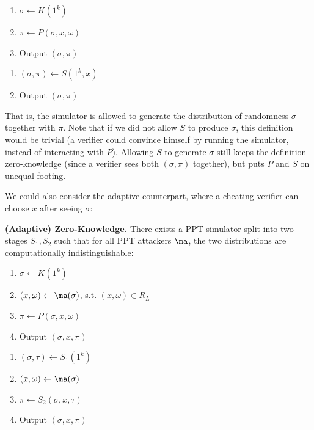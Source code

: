 \begin{minipage}{0.5\textwidth}
    \begin{enumerate}[itemsep=-3pt]
        \item $\sigma \gets K(1^k)$
        \item $\pi \gets P(\sigma, x, \omega)$
        \item Output $(\sigma, \pi)$
    \end{enumerate}
\end{minipage}
\begin{minipage}{0.5\textwidth}
    \begin{enumerate}
        \item $(\sigma, \pi) \gets S(1^k, x)$
        \item Output $(\sigma, \pi)$
    \end{enumerate}
\end{minipage}

\medskip
That is, the simulator is allowed to generate the distribution of randomness
$\sigma$ together with $\pi$. Note that if we did not allow $S$ to produce
$\sigma$, this definition would be trivial (a verifier could convince himself by
running the simulator, instead of interacting with $P$). Allowing $S$ to
generate $\sigma$ still keeps the definition zero-knowledge (since a verifier sees both $(\sigma,
\pi)$ together), but puts $P$ and $S$ on unequal footing.

We could also consider the adaptive counterpart, where a cheating verifier can
choose $x$ after seeing $\sigma$:

\medskip
\noindent\textbf{(Adaptive) Zero-Knowledge.}
    There exists a PPT simulator split into two stages $S_1, S_2$ such that
    for all PPT attackers $\ma$,
    the two distributions are computationally indistinguishable:

\medskip
\begin{minipage}{0.5\textwidth}
    \begin{enumerate}[itemsep=0pt]
        \item $\sigma \gets K(1^k)$
        \item $(x, \omega) \gets \ma(\sigma)$, s.t. $(x, \omega) \in R_L$
        \item $\pi \gets P(\sigma, x, \omega)$
        \item Output $(\sigma, x, \pi)$
    \end{enumerate}
\end{minipage}
\begin{minipage}{0.5\textwidth}
    \begin{enumerate}[itemsep=0pt]
        \item $(\sigma, \tau) \gets S_1(1^k)$
        \item $(x, \omega) \gets \ma(\sigma)$
        \item $\pi \gets S_2(\sigma, x, \tau)$
        \item Output $(\sigma, x, \pi)$
    \end{enumerate}
\end{minipage}

